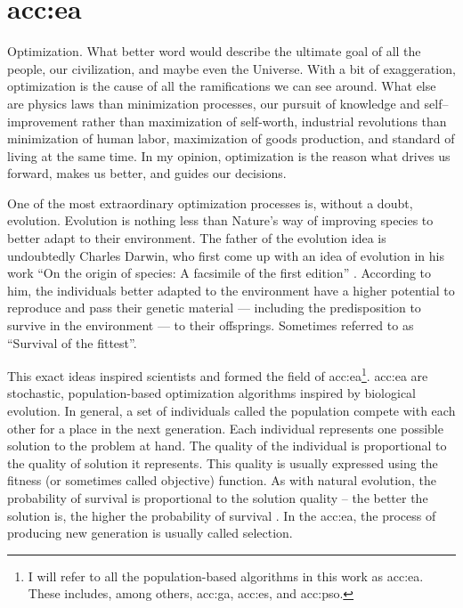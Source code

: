 \chapter{\texorpdfstring{\acrlong*{acc:ea}}{Evolutionary algorithms}}
\label{chap:eva}

Optimization. What better word would describe the ultimate goal of all the people, our civilization, and maybe even the Universe. With a bit of exaggeration, optimization is the cause of all the ramifications we can see around. What else are physics laws than minimization processes, our pursuit of knowledge and self--improvement rather than maximization of self-worth, industrial revolutions than minimization of human labor, maximization of goods production, and standard of living at the same time. In my opinion, optimization is the reason what drives us forward, makes us better, and guides our decisions.

One of the most extraordinary optimization processes is, without a doubt, evolution. Evolution is nothing less than Nature's way of improving species to better adapt to their environment. The father of the evolution idea is undoubtedly Charles Darwin, who first come up with an idea of evolution in his work \enquote{On the origin of species: A facsimile of the first edition} \citep{darwin1964origin}. According to him, the individuals better adapted to the environment have a higher potential to reproduce and pass their genetic material --- including the predisposition to survive in the environment --- to their offsprings. Sometimes referred to as \enquote{Survival of the fittest}.

This exact ideas inspired scientists and formed the field of \acrfull{acc:ea}\footnote{I will refer to all the population-based algorithms in this work as \acrlong*{acc:ea}. These includes, among others, \acrlong*{acc:ga}, \acrlong*{acc:es}, and \acrlong*{acc:pso}.}.
\acrshort{acc:ea} are stochastic, population-based optimization algorithms inspired by biological evolution. In general, a set of individuals called the population compete with each other for a place in the next generation. Each individual represents one possible solution to the problem at hand. The quality of the individual is proportional to the quality of solution it represents. This quality is usually expressed using the fitness (or sometimes called objective) function. As with natural evolution, the probability of survival is proportional to the solution quality -- the better the solution is, the higher the probability of survival \citep{IntroductionToEA}. In the \acrshort{acc:ea}, the process of producing new generation is usually called selection.

